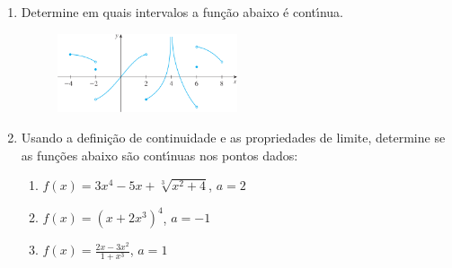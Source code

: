 \documentclass[a4paper,5pt]{amsbook}
\newcommand{\ds}{\displaystyle}
\begin{document}
\vspace{1cm}
\begin{enumerate}
    \vspace{0.5cm}
    \item Determine em quais intervalos a fun\c{c}\~ao abaixo \'e cont\'{\i}nua.
        \begin{figure}[h]
            \centering
            \includegraphics[width=0.5\textwidth]{lista-05-fig1.png}
        \end{figure}

    \vspace{0.5cm}
    \item Usando a defini\c{c}\~ao de continuidade e as propriedades de limite,
        determine se as fun\c{c}\~oes abaixo s\~ao cont\'{\i}nuas nos pontos dados:
        \begin{enumerate}
            \vspace{0.3cm}
            \item $f(x)=3x^4-5x+\sqrt[3]{x^2+4}$, $a=2$
            \vspace{0.3cm}
            \item $f(x)={(x+2x^3)}^4$, $a=-1$
            \vspace{0.3cm}
            \item $f(x)=\ds\frac{2x-3x^2}{1+x^3}$, $a=1$
        \end{enumerate}


\end{enumerate}
\end{document}
